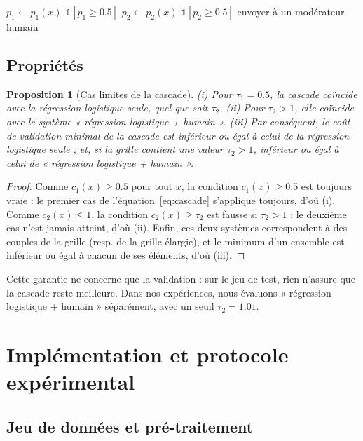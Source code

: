 \documentclass[a4paper,fleqn]{cas-sc}
\newtheorem{theorem}{Proposition}
\begin{document}
\begin{algorithm}[t]
\caption{Décision pour un nouveau message $x$}
\label{alg:predict}
\begin{algorithmic}[1]
\State $p_1 \gets p_1(x)$
 \Return $\mathbb{1}[p_1\ge 0.5]$
\EndIf
\State $p_2 \gets p_2(x)$ 
 \Return $\mathbb{1}[p_2\ge 0.5]$
\EndIf
\State \Return envoyer à un modérateur humain
\end{algorithmic}
\end{algorithm}

\subsection{Propriétés}

\begin{theorem}[Cas limites de la cascade]
\label{thm:lim}
(i) Pour $\tau_1=0.5$, la cascade coïncide avec la régression logistique seule, quel que soit $\tau_2$.
(ii) Pour $\tau_2>1$, elle coïncide avec le système « régression logistique + humain ».
(iii) Par conséquent, le coût de validation minimal de la cascade est inférieur ou égal à celui de la
régression logistique seule ; et, si la grille contient une valeur $\tau_2>1$, inférieur ou égal à celui de
« régression logistique + humain ».
\end{theorem}
\begin{proof}
Comme $c_1(x)\ge 0.5$ pour tout $x$, la condition $c_1(x)\ge 0.5$ est toujours vraie : le premier cas
de l'équation~\eqref{eq:cascade} s'applique toujours, d'où (i). Comme $c_2(x)\le 1$, la condition
$c_2(x)\ge\tau_2$ est fausse si $\tau_2>1$ : le deuxième cas n'est jamais atteint, d'où (ii). Enfin, ces
deux systèmes correspondent à des couples de la grille (resp. de la grille élargie), et le minimum d'un
ensemble est inférieur ou égal à chacun de ses éléments, d'où (iii).
\end{proof}
Cette garantie ne concerne que la validation : sur le jeu de test, rien n'assure que la cascade
reste meilleure. Dans nos expériences, nous évaluons « régression logistique + humain » séparément, avec
un seuil $\tau_2=1.01$.

\section{Implémentation et protocole expérimental}
\label{sec:impl}

\subsection{Jeu de données et pré-traitement}
\end{document}
